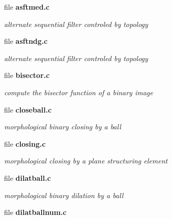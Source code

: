 \begin{DoxyCompactItemize}
\item 
file {\bf asftmed.c}


\begin{DoxyCompactList}\small\item\em alternate sequential filter controled by topology \item\end{DoxyCompactList}

\item 
file {\bf asftndg.c}


\begin{DoxyCompactList}\small\item\em alternate sequential filter controled by topology \item\end{DoxyCompactList}

\item 
file {\bf bisector.c}


\begin{DoxyCompactList}\small\item\em compute the bisector function of a binary image \item\end{DoxyCompactList}

\item 
file {\bf closeball.c}


\begin{DoxyCompactList}\small\item\em morphological binary closing by a ball \item\end{DoxyCompactList}

\item 
file {\bf closing.c}


\begin{DoxyCompactList}\small\item\em morphological closing by a plane structuring element \item\end{DoxyCompactList}

\item 
file {\bf dilatball.c}


\begin{DoxyCompactList}\small\item\em morphological binary dilation by a ball \item\end{DoxyCompactList}

\item 
file {\bf dilatballnum.c}



\end{DoxyCompactItemize}
